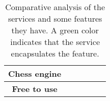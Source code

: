 \begin{table}[h]
{\begin{tabular}{clllll}
            \rowcolor[HTML]{FD6864}
            \cellcolor[HTML]{EFEFEF}\textbf{Chess engine}                            & \multicolumn{1}{l}{\cellcolor[HTML]{67FD9A}}                   & \multicolumn{1}{l}{\cellcolor[HTML]{67FD9A}}                     & \multicolumn{1}{l}{\cellcolor[HTML]{FD6864}}                   & \multicolumn{1}{l}{\cellcolor[HTML]{FD6864}}                        &                                                                    \\ \midrule
            \rowcolor[HTML]{67FD9A}
            \cellcolor[HTML]{EFEFEF}\textbf{Free to use}                             & \multicolumn{1}{l}{\cellcolor[HTML]{67FD9A}}                   & \multicolumn{1}{l}{\cellcolor[HTML]{67FD9A}}                     & \multicolumn{1}{l}{\cellcolor[HTML]{67FD9A}}                   & \multicolumn{1}{l}{\cellcolor[HTML]{FD6864}}                        &                                                                    \\ \bottomrule
        \end{tabular}%
    }
    \caption{Comparative analysis of the services and some features they have.
    A green color indicates that the service encapsulates the feature.}\label{tab:comparative-analysis}
\end{table}
